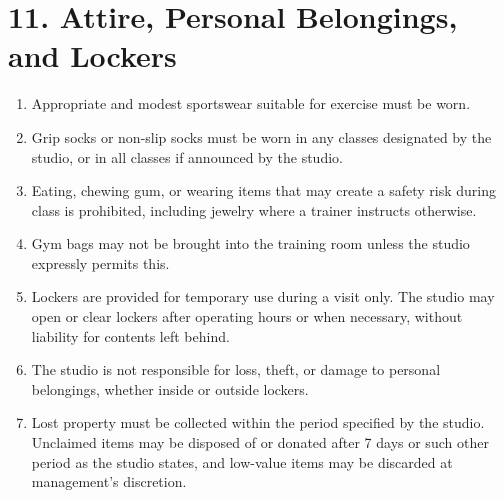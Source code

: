 \documentclass[12pt,a4paper]{article}
\begin{document}
\section*{11. Attire, Personal Belongings, and Lockers}
\begin{enumerate}
    \item Appropriate and modest sportswear suitable for exercise must be worn.
    \item Grip socks or non-slip socks must be worn in any classes designated by the studio, or in all classes if announced by the studio.
    \item Eating, chewing gum, or wearing items that may create a safety risk during class is prohibited, including jewelry where a trainer instructs otherwise.
    \item Gym bags may not be brought into the training room unless the studio expressly permits this.
    \item Lockers are provided for temporary use during a visit only. The studio may open or clear lockers after operating hours or when necessary, without liability for contents left behind.
    \item The studio is not responsible for loss, theft, or damage to personal belongings, whether inside or outside lockers.
    \item Lost property must be collected within the period specified by the studio. Unclaimed items may be disposed of or donated after 7 days or such other period as the studio states, and low-value items may be discarded at management’s discretion.
\end{enumerate}
\end{document}
